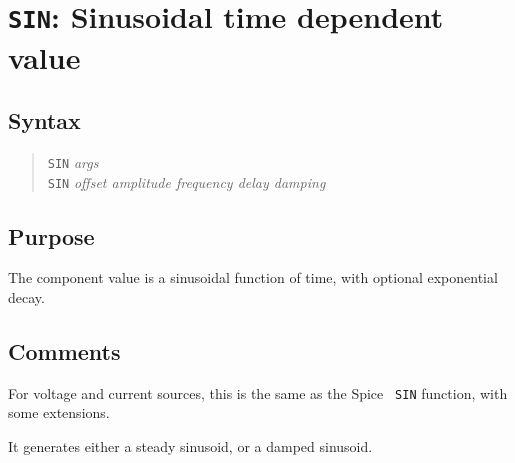 %
%
%
%
\section{{\tt SIN}: Sinusoidal time dependent value}
\subsection{Syntax}
\begin{verse}
{\tt SIN} {\it args}\\
{\tt SIN} {\it offset amplitude frequency delay damping}
\end{verse}
\subsection{Purpose}

The component value is a sinusoidal function of time, with optional
exponential decay.
\subsection{Comments}

For voltage and current sources, this is the same as the Spice {\tt
SIN} function, with some extensions.

It generates either a steady sinusoid, or a damped sinusoid.

